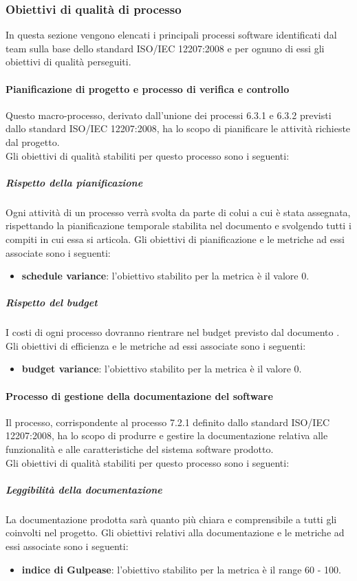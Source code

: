 		\subsubsection{Obiettivi di qualità di processo}
		In questa sezione vengono elencati i principali processi software identificati dal team sulla base dello standard ISO/IEC 12207:2008 e per ognuno di essi gli obiettivi di qualità perseguiti.
			
			\paragraph{Pianificazione di progetto e processo di verifica e controllo}
			Questo macro-processo, derivato dall'unione dei processi 6.3.1 e 6.3.2 previsti dallo standard ISO/IEC 12207:2008, ha lo scopo di pianificare le attività richieste dal progetto.
			\\Gli obiettivi di qualità stabiliti per questo processo sono i seguenti:
				\subparagraph{Rispetto della pianificazione} 
				Ogni attività di un processo verrà svolta da parte di colui a cui è stata assegnata, rispettando la pianificazione temporale stabilita nel documento \PdP{} e svolgendo tutti i compiti in cui essa si articola.
				Gli obiettivi di pianificazione e le metriche ad essi associate sono i seguenti:
		 		\begin{itemize}
					\item \textbf{schedule variance}: l'obiettivo stabilito per la metrica è il valore 0.
				\end{itemize}
				\subparagraph{Rispetto del budget}   
				I costi di ogni processo dovranno rientrare nel budget previsto dal documento \PdP.
				Gli obiettivi di efficienza e le metriche ad essi associate sono i seguenti:
		 		\begin{itemize}
					\item \textbf{budget variance}: l'obiettivo stabilito per la metrica è il valore 0.
				\end{itemize}
				
			\paragraph{Processo di gestione della documentazione del software}
			Il processo, corrispondente al processo 7.2.1 definito dallo standard ISO/IEC 12207:2008, ha lo scopo di produrre e gestire la documentazione relativa alle funzionalità e alle caratteristiche del sistema software prodotto.
			\\Gli obiettivi di qualità stabiliti per questo processo sono i seguenti:
				\subparagraph{Leggibilità della documentazione}
				La documentazione prodotta sarà quanto più chiara e comprensibile a tutti gli  coinvolti nel progetto.
				Gli obiettivi relativi alla documentazione e le metriche ad essi associate sono i seguenti:
		 		\begin{itemize}
					\item \textbf{indice di Gulpease}: l'obiettivo stabilito per la metrica è il range 60 - 100.
				\end{itemize}
				
